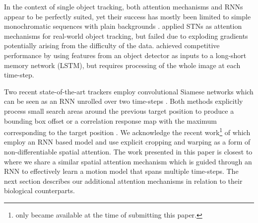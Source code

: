 In the context of single object tracking, both attention mechanisms and RNNs appear to be perfectly suited, yet their success has mostly been limited to simple monochromatic sequences with plain backgrounds \cite{Kahou2015ratm}. \citet{Cheung2016gtc} applied STNs \cite{Jaderberg2015} as attention mechanisms for real-world object tracking, but failed due to exploding gradients potentially arising from the difficulty of the data.
\citet{Ning2016} achieved competitive performance by using features from an object detector as inputs to a long-short memory network (LSTM), but requires processing of the whole image at each time-step. 

Two recent state-of-the-art trackers employ convolutional Siamese networks which can be seen as an RNN unrolled over two time-steps \cite{Held2016, Valmadre2017}. Both methods explicitly process small search areas around the previous target position to produce a bounding box offset \cite{Held2016} or a correlation response map with the maximum corresponding to the target position \cite{Valmadre2017}. 
We acknowledge the recent work\footnote{\cite{Gordon2017} only became available at the time of submitting this paper.} of \citet{Gordon2017} which employ an RNN based model and use explicit cropping and warping as a form of non-differentiable spatial attention.
The work presented in this paper is closest to \cite{Kahou2015ratm} where we share a similar spatial attention mechanism which is guided through an RNN to effectively learn a motion model that spans multiple time-steps. The next section describes our additional attention mechanisms in relation to their biological counterparts.



    
    